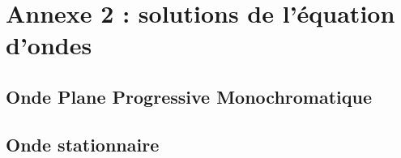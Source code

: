 \chapter*{Annexe 2 : solutions de l'équation d'ondes}
\label{annexe2}
\section{Onde Plane Progressive Monochromatique}

\section{Onde stationnaire}